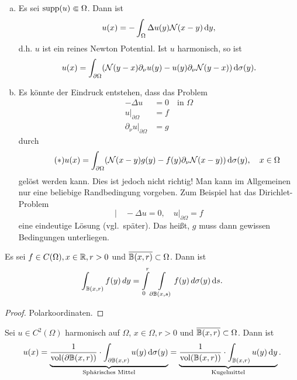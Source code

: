 \begin{bem}
  \begin{enumerate}[(a)]
  \item Es sei $\operatorname{supp}(u)\Subset\Omega$. Dann ist
    \[
    u(x)=-\int_\Omega\Delta u(y)\mathcal{N}(x-y)\,\mathrm{d} y,
    \]
    d.h. $u$ ist ein reines Newton Potential. Ist $u$ harmonisch, so ist
    \[
    	u(x) = \int_{\partial\Omega}(\mathcal{N}(y-x)\partial_\nu u(y)-u(y)\partial_\nu\mathcal{N}(y-x))\,\mathrm{d}\sigma(y) .
    \]

  \item Es könnte der Eindruck entstehen, dass das Problem
    \begin{align*}
      -\Delta u&=0\quad\text{in } \Omega \\
      u\rvert_{\partial\Omega}&= f \\
      \partial_\nu u\rvert_{\partial\Omega}&=g
    \end{align*}
    durch
    \[
    \tag{$\ast$}
    \label{eq:4.star}
    u(x)=\int_{\partial\Omega}(\mathcal{N}(x-y)g(y)-f(y)\partial_\nu\mathcal{N}(x-y))\,\mathrm{d}\sigma(y),\quad x\in\Omega
    \]
    gelöst werden kann. Dies ist jedoch nicht richtig! Man kann im Allgemeinen nur eine beliebige Randbedingung vorgeben. Zum Beispiel hat das Dirichlet-Problem
    \[
          \Big\vert \quad -\Delta u=0,\quad u\rvert_{\partial\Omega}=f
    \]
    eine eindeutige Lösung (vgl.\ später). Das heißt, $g$ muss dann gewissen Bedingungen unterliegen.
  \end{enumerate}
\end{bem}

\begin{lemma}
  \label{lemma:4.8}
  Es sei $f\in C(\Omega), x\in\mathbb{R}, r>0$ und $\overline{\mathbb{B}(x,r)}\subset\Omega$. Dann ist
  \[
  \int_{\mathbb{B}(x,r)}f(y)\,dy=\int\limits_0^r\int\limits_{\partial\mathbb{B}(x,s)}f(y)\,d\sigma(y)\,\mathrm{d} s.
  \]
\end{lemma}

\begin{proof}
  Polarkoordinaten.
\end{proof}

\begin{theorem}[Mittelwerteigenschaft]
  \label{theorem:4.9}
  Sei $u\in C^2(\Omega)$ harmonisch auf $\Omega$, $x\in\Omega, r>0$ und $\overline{\mathbb{B}(x,r)}\subset\Omega$. Dann ist
  \[
  u(x)=\underbrace{
    \frac1{\operatorname{vol}(\partial\mathbb{B}(x,r))}\cdot\int_{\partial\mathbb{B}(x,r)} u(y)\,\mathrm{d}\sigma(y)
  }_{\text{Sphärisches Mittel}}
  =\underbrace{
    \frac1{\operatorname{vol}(\mathbb{B}(x,r))}\cdot\int_{\mathbb{B}(x,r)}u(y)\,\mathrm{d} y
  }_{\text{Kugelmittel}}.
  \]
\end{theorem}

